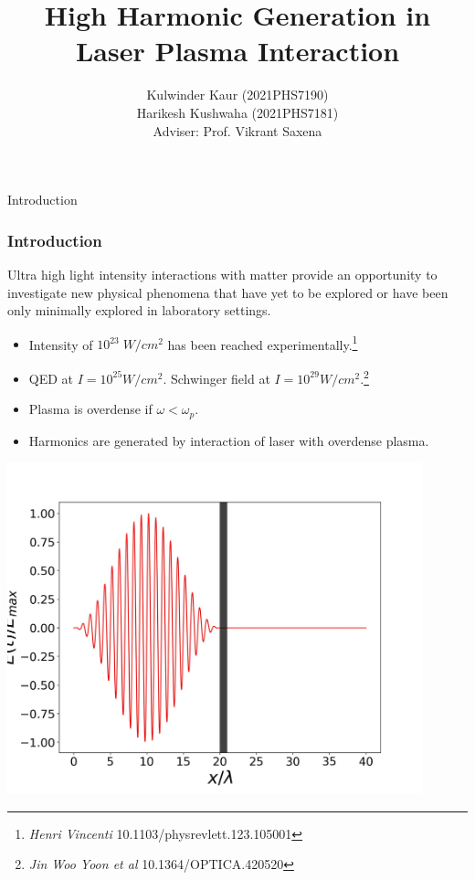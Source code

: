 \documentclass{beamer}
\title[High Harmonic Generation]{High Harmonic Generation in Laser Plasma Interaction}
\date{}
\institute[IIT Delhi]{\large Indian Institute of Technology, Delhi}
\author[]{Kulwinder Kaur (2021PHS7190)\\ Harikesh Kushwaha (2021PHS7181)\\[3mm]Adviser: Prof. Vikrant Saxena}
\begin{document}
\maketitle

\begin{frame}{Introduction}
    \frametitle{Introduction}
    \small
    Ultra high light intensity interactions with matter provide an opportunity to investigate new physical phenomena that have yet to be explored or have been only minimally explored in laboratory settings.
    \begin{itemize}
        \item Intensity of $10^{23} \; W/cm^{2}$ has been reached experimentally.\footnote{\textit{Henri Vincenti} 10.1103/physrevlett.123.105001}
        \item QED at $I = 10^{25}W/cm^{2}$. Schwinger field at $I = 10^{29}W/cm^{2}$.\footnote{\textit{Jin Woo Yoon et al} 10.1364/OPTICA.420520}
        \item Plasma is overdense if $\omega<\omega_p$.
        \item Harmonics are generated by interaction of laser with overdense plasma.
    \end{itemize}
    \begin{minipage}[h]{0.48\linewidth}
        \centering
        \includegraphics[width=0.9\textwidth, height=0.42\textheight]{images/field.jpg}
        \label{fig:field}
    \end{minipage}
    \begin{minipage}[h]{0.48\linewidth}
        \begin{figure}
            \centering

\end{figure}
\end{minipage}
\end{frame}
\end{document}
